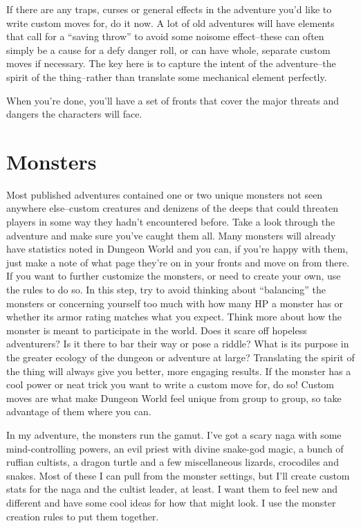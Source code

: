  If there are any traps, curses or general effects in the adventure you'd like to write custom moves for, do it now. A lot of old adventures will have elements that call for a ``saving throw'' to avoid some noisome effect--these can often simply be a cause for a defy danger roll, or can have whole, separate custom moves if necessary. The key here is to capture the intent of the adventure--the spirit of the thing--rather than translate some mechanical element perfectly.


 When you're done, you'll have a set of fronts that cover the major threats and dangers the characters will face.
\section*{Monsters}


 Most published adventures contained one or two unique monsters not seen anywhere else--custom creatures and denizens of the deeps that could threaten players in some way they hadn't encountered before. Take a look through the adventure and make sure you've caught them all. Many monsters will already have statistics noted in Dungeon World and you can, if you're happy with them, just make a note of what page they're on in your fronts and move on from there. If you want to further customize the monsters, or need to create your own, use the rules to do so. In this step, try to avoid thinking about ``balancing'' the monsters or concerning yourself too much with how many HP a monster has or whether its armor rating matches what you expect. Think more about how the monster is meant to participate in the world. Does it scare off hopeless adventurers? Is it there to bar their way or pose a riddle? What is its purpose in the greater ecology of the dungeon or adventure at large? Translating the spirit of the thing will always give you better, more engaging results. If the monster has a cool power or neat trick you want to write a custom move for, do so! Custom moves are what make Dungeon World feel unique from group to group, so take advantage of them where you can.


 In my adventure, the monsters run the gamut. I've got a scary naga with some mind-controlling powers, an evil priest with divine snake-god magic, a bunch of ruffian cultists, a dragon turtle and a few miscellaneous lizards, crocodiles and snakes. Most of these I can pull from the monster settings, but I'll create custom stats for the naga and the cultist leader, at least. I want them to feel new and different and have some cool ideas for how that might look. I use the monster creation rules to put them together.
